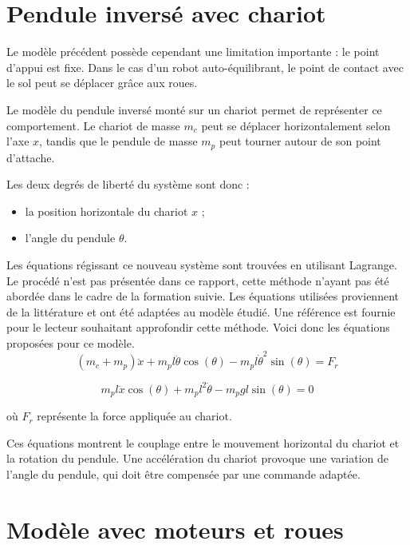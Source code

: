 \section{Pendule inversé avec chariot}

Le modèle précédent possède cependant une limitation importante : le point d'appui est fixe. Dans le cas d'un robot auto-équilibrant, le point de contact avec le sol peut se déplacer grâce aux roues.

Le modèle du pendule inversé monté sur un chariot permet de représenter ce comportement. Le chariot de masse $m_c$ peut se déplacer horizontalement selon l'axe $x$, tandis que le pendule de masse $m_p$ peut tourner autour de son point d'attache.

Les deux degrés de liberté du système sont donc :

\begin{itemize}
    \item la position horizontale du chariot $x$ ;
    \item l'angle du pendule $\theta$.
\end{itemize}

Les équations régissant ce nouveau système sont trouvées en utilisant Lagrange. Le procédé n'est pas présentée dans ce rapport, cette méthode n'ayant pas été abordée dans le cadre de la formation suivie. Les équations utilisées proviennent de la littérature et ont été adaptées au modèle étudié. Une référence est fournie pour le lecteur souhaitant approfondir cette méthode.
\cite{wiki_inverted_pendulum}
Voici donc les équations proposées pour ce modèle.
\begin{equation}
(m_c+m_p)\ddot{x}
+
m_pl\ddot{\theta}\cos(\theta)
-
m_pl\dot{\theta}^{2}\sin(\theta)
=
F_r
\end{equation}

\begin{equation}
m_pl\ddot{x}\cos(\theta)
+
m_pl^2\ddot{\theta}
-
m_pgl\sin(\theta)
=
0
\end{equation}

où $F_r$ représente la force appliquée au chariot.

Ces équations montrent le couplage entre le mouvement horizontal du chariot et la rotation du pendule. Une accélération du chariot provoque une variation de l'angle du pendule, qui doit être compensée par une commande adaptée.

\section{Modèle avec moteurs et roues}

